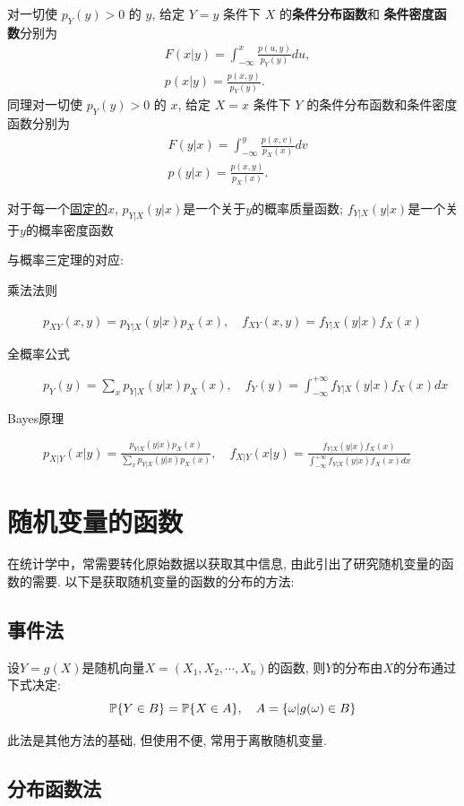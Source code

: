 \begin{definition}
	对一切使 $p_Y(y)>0$ 的 $y$, 给定 $Y=y$ 条件下 $X$ 的\textbf{条件分布函数}和
	\textbf{条件密度函数}分别为
	\begin{align}
		 & F(x | y)=\int_{-\infty}^{x} \frac{p(u, y)}{p_{Y}(y)} du,  \\
		 & p(x | y)=\frac{p(x, y)}{p_{Y}(y)}.
	\end{align}
	同理对一切使 $p_Y(y)>0$ 的 $x$, 给定 $X=x$ 条件下 $Y$ 的条件分布函数和条件密度函数分别为
	\begin{align}
		 & F(y | x)=\int_{-\infty}^{y} \frac{p(x, v)}{p_{X}(x)} dv  \\
		 & p(y | x)=\frac{p(x, y)}{p_{X}(x)}.
	\end{align}
\end{definition}

\begin{remark}
    对于每一个\underline{固定的$x$}, $p_{Y|X}(y|x)$是一个关于$y$的概率质量函数; $f_{Y|X}(y|x)$是一个关于$y$的概率密度函数
\end{remark}

与概率三定理的对应:
\begin{description}
    \item[乘法法则] $p_{XY}(x,y)=p_{Y|X}(y|x)p_{X}(x), \quad f_{XY}(x,y)=f_{Y|X}(y|x)f_{X}(x)$
    \item[全概率公式] $p_{Y}(y)=\sum_{x}p_{Y|X}(y|x)p_{X}(x), \quad f_{Y}(y)=\int^{+\infty}_{-\infty}f_{Y|X}(y|x)f_{X}(x)dx$
    \item[Bayes原理]  $p_{X|Y}(x|y)=\frac{p_{Y|X}(y|x)p_{X}(x)}{\sum_{x}p_{Y|X}(y|x)p_{X}(x)}, \quad f_{X|Y}(x|y)=\frac{f_{Y|X}(y|x)f_{X}(x)}{\int^{+\infty}_{-\infty}f_{Y|X}(y|x)f_{X}(x)dx}$
\end{description}

\section{随机变量的函数}

在统计学中，常需要转化原始数据以获取其中信息, 由此引出了研究随机变量的函数的需要. 以下是获取随机变量的函数的分布的方法:

\subsection{事件法}

\begin{theorem}
    设$Y=g(X)$是随机向量$X=(X_1,X_2,\cdots ,X_n)$的函数, 则$Y$的分布由$X$的分布通过下式决定:
    \[ \P\{Y \in B\} = \P\{X \in A\}, \quad A=\{ \omega |g(\omega)\in B\} \] 
\end{theorem}

此法是其他方法的基础, 但使用不便, 常用于离散随机变量.

\begin{example}
    
\end{example}

\subsection{分布函数法}

